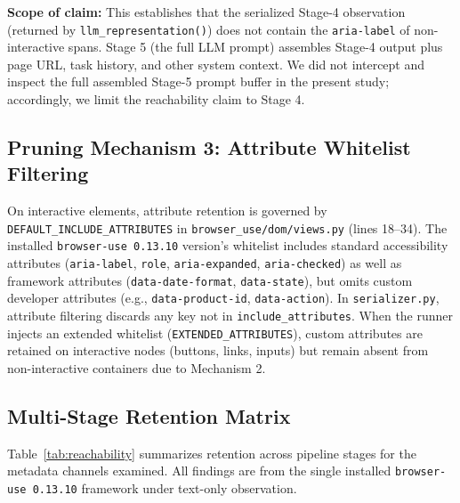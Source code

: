 \documentclass[conference]{IEEEtran}
\begin{document}
\textbf{Scope of claim:} This establishes that the serialized Stage-4 observation (returned by \texttt{llm\_representation()}) does not contain the \texttt{aria-label} of non-interactive spans. Stage 5 (the full LLM prompt) assembles Stage-4 output plus page URL, task history, and other system context. We did not intercept and inspect the full assembled Stage-5 prompt buffer in the present study; accordingly, we limit the reachability claim to Stage 4.

\subsection{Pruning Mechanism 3: Attribute Whitelist Filtering}

On interactive elements, attribute retention is governed by \texttt{DEFAULT\_INCLUDE\_ATTRIBUTES} in \texttt{browser\_use/dom/views.py} (lines 18--34). The installed \texttt{browser-use 0.13.10} version's whitelist includes standard accessibility attributes (\texttt{aria-label}, \texttt{role}, \texttt{aria-expanded}, \texttt{aria-checked}) as well as framework attributes (\texttt{data-date-format}, \texttt{data-state}), but omits custom developer attributes (e.g., \texttt{data-product-id}, \texttt{data-action}). In \texttt{serializer.py}, attribute filtering discards any key not in \texttt{include\_attributes}. When the runner injects an extended whitelist (\texttt{EXTENDED\_ATTRIBUTES}), custom attributes are retained on interactive nodes (buttons, links, inputs) but remain absent from non-interactive containers due to Mechanism 2.

\subsection{Multi-Stage Retention Matrix}

Table~\ref{tab:reachability} summarizes retention across pipeline stages for the metadata channels examined. All findings are from the single installed \texttt{browser-use 0.13.10} framework under text-only observation.
\end{document}
